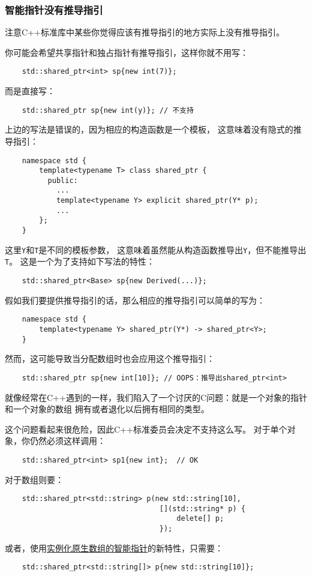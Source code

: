 \subsubsection*{智能指针没有推导指引}
注意C++标准库中某些你觉得应该有推导指引的地方实际上没有推导指引。

你可能会希望共享指针和独占指针有推导指引，这样你就不用写：
\begin{lstlisting}
    std::shared_ptr<int> sp{new int(7)};
\end{lstlisting}
而是直接写：
\begin{lstlisting}
    std::shared_ptr sp{new int(y)}; // 不支持
\end{lstlisting}
上边的写法是错误的，因为相应的构造函数是一个模板，
这意味着没有隐式的推导指引：
\begin{lstlisting}
    namespace std {
        template<typename T> class shared_ptr {
          public:
            ...
            template<typename Y> explicit shared_ptr(Y* p);
            ...
        };
    }
\end{lstlisting}
这里\texttt{Y}和\texttt{T}是不同的模板参数，
这意味着虽然能从构造函数推导出\texttt{Y}，但不能推导出\texttt{T}。
这是一个为了支持如下写法的特性：
\begin{lstlisting}
    std::shared_ptr<Base> sp{new Derived(...)};
\end{lstlisting}
假如我们要提供推导指引的话，那么相应的推导指引可以简单的写为：
\begin{lstlisting}
    namespace std {
        template<typename Y> shared_ptr(Y*) -> shared_ptr<Y>;
    }
\end{lstlisting}
然而，这可能导致当分配数组时也会应用这个推导指引：
\begin{lstlisting}
    std::shared_ptr sp{new int[10]}; // OOPS：推导出shared_ptr<int>
\end{lstlisting}
就像经常在C++遇到的一样，我们陷入了一个讨厌的C问题：就是一个对象的指针和一个对象的数组
拥有或者退化以后拥有相同的类型。

这个问题看起来很危险，因此C++标准委员会决定不支持这么写。
对于单个对象，你仍然必须这样调用：
\begin{lstlisting}
    std::shared_ptr<int> sp1{new int};  // OK
\end{lstlisting}
对于数组则要：
\begin{lstlisting}
    std::shared_ptr<std::string> p(new std::string[10],
                                    [](std::string* p) {
                                        delete[] p;
                                    });
\end{lstlisting}
或者，使用\hyperref[ch28.2.1]{实例化原生数组的智能指针}的新特性，只需要：
\begin{lstlisting}
    std::shared_ptr<std::string[]> p{new std::string[10]};
\end{lstlisting}

